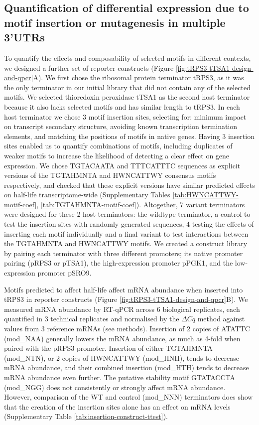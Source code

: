 \documentclass[../main.tex]{subfiles}
\begin{document}
\subsection{Quantification of differential expression due to motif insertion or mutagenesis in multiple 3'UTRs}

To quantify the effects and composability of selected motifs in different contexts, we designed a further set of reporter constructs (Figure \ref{fig:tRPS3-tTSA1-design-and-qpcr}A).
We first chose the ribosomal protein terminator tRPS3, as it was the only terminator in our initial library that did not contain any of the selected motifs.
We selected thioredoxin peroxidase tTSA1 as the second host terminator because it also lacks selected motifs and has similar length to tRPS3.
In each host terminator we chose 3 motif insertion sites, selecting for: minimum impact on transcript secondary structure, avoiding known transcription termination elements, and matching the positions of motifs in native genes.
Having 3 insertion sites enabled us to quantify combinations of motifs, including duplicates of weaker motifs to increase the likelihood of detecting a clear effect on gene expression.
We chose TGTACAATA and TTTCATTTC sequences as explicit versions of the TGTAHMNTA and HWNCATTWY consensus motifs respectively, and checked that these explicit versions have similar predicted effects on half-life transcriptome-wide (Supplementary Tables \ref{tab:HWNCATTWY-motif-coef}, \ref{tab:TGTAHMNTA-motif-coef}).
Altogether, 7 variant terminators were designed for these 2 host terminators: the wildtype terminator, a control to test the insertion sites with randomly generated sequences, 4 testing the effects of inserting each motif individually and a final variant to test interactions between the TGTAHMNTA and HWNCATTWY motifs.
We created a construct library by pairing each terminator with three different promoters; its native promoter pairing (pRPS3 or pTSA1), the high-expression promoter pPGK1, and the low-expression promoter pSRO9.

Motifs predicted to affect half-life affect mRNA abundance when inserted into tRPS3 in reporter constructs (Figure \ref{fig:tRPS3-tTSA1-design-and-qpcr}B).
We measured mRNA abundance by RT-qPCR across 6 biological replicates, each quantified in 3 technical replicates and normalised by the \(\Delta Cq\) method against values from 3 reference mRNAs (see methods).
Insertion of 2 copies of ATATTC (mod\_NAA) generally lowers the mRNA abundance, as much as 4-fold when paired with the pRPS3 promoter.
Insertion of either TGTAHMNTA (mod\_NTN), or 2 copies of HWNCATTWY (mod\_HNH), tends to decrease mRNA abundance, and their combined insertion (mod\_HTH) tends to decrease mRNA abundance even further.
The putative stability motif GTATACCTA (mod\_NGG) does not consistently or strongly affect mRNA abundance.
However, comparison of the WT and control (mod\_NNN) terminators does show that the creation of the insertion sites alone has an effect on mRNA levels (Supplementary Table \ref{tab:insertion-construct-ttest}).
\end{document}
